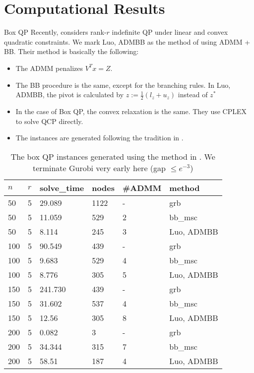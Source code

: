 \documentclass[aspectratio=1610, 9pt]{beamer}
\begin{document}
\section{Computational Results}
\setlength\pdfpagewidth{16.00cm}%
\setlength\pdfpageheight{20.00cm}%
\begin{frame}[standout]{Box QP}
  Recently, \cite{luo_new_2019} considers rank-\(r\) indefinite QP under linear and convex quadratic constraints. We mark \textsf{Luo, ADMBB} as the method of using ADMM + BB.  Their method is basically the following:
  \begin{itemize}
    \item The ADMM penalizes \(V^Tx = Z\).
    \item The BB procedure is the same, except for the branching rules. In \textsf{Luo, ADMBB}, the pivot is calculated by \(z := \frac{1}{2}(l_z + u_z)\) instead of \(z^*\)
    \item In the case of Box QP, the convex relaxation is the same. They use CPLEX to solve QCP directly.
    \item The instances are generated following the tradition in \cite{le_an_solving_1997}.
  \end{itemize}


  \small
  \begin{table}[h!]
    \centering
    \begin{tabular}{llllll}
      \toprule
      \(n\) & \(r\) & solve\_time & nodes & \#ADMM & method              \\
      \midrule
      50    & 5     & 29.089      & 1122  & -      & grb                 \\
      50    & 5     & 11.059      & 529   & 2      & bb\_msc             \\
      50    & 5     & 8.114       & 245   & 3      & \textsf{Luo, ADMBB} \\
      100   & 5     & 90.549      & 439   & -      & grb                 \\
      100   & 5     & 9.683       & 529   & 4      & bb\_msc             \\
      100   & 5     & 8.776       & 305   & 5      & \textsf{Luo, ADMBB} \\
      150   & 5     & 241.730     & 439   & -      & grb                 \\
      150   & 5     & 31.602      & 537   & 4      & bb\_msc             \\
      150   & 5     & 12.56       & 305   & 8      & \textsf{Luo, ADMBB} \\
      200   & 5     & 0.082       & 3     & -      & grb                 \\
      200   & 5     & 34.344      & 315   & 7      & bb\_msc             \\
      200   & 5     & 58.51       & 187   & 4      & \textsf{Luo, ADMBB} \\
      \bottomrule
    \end{tabular}
    \caption{The box QP instances generated using the method in \cite{luo_new_2019}.
      We terminate Gurobi very early here (gap \(\le e^{-3}\))}



\end{table}
\end{frame}
\end{document}

